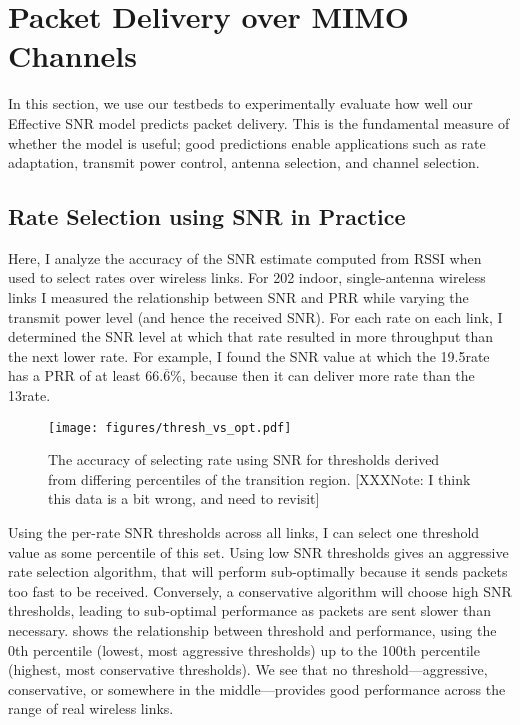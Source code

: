 \ifx\mainfile\undefined

\setcounter{chapter}{5} %
\fi

\cleardoublepage
\chapter{Packet Delivery over MIMO Channels}
\label{chap:delivery}

In this section, we use our testbeds to experimentally evaluate how well our Effective SNR model predicts packet delivery. This is the fundamental measure of whether the model is useful; good predictions enable applications such as rate adaptation, transmit power control, antenna selection, and channel selection.

\section{Rate Selection using SNR in Practice}
Here, I analyze the accuracy of the SNR estimate computed from RSSI when used to select rates over wireless links. For 202 indoor, single-antenna wireless links I measured the relationship between SNR and PRR while varying the transmit power level (and hence the received SNR). For each rate on each link, I determined the SNR level at which that rate resulted in more throughput than the next lower rate. For example, I found the SNR value at which the 19.5\Mbps rate has a PRR of at least $66.\overline{6}\%$, because then it can deliver more rate than the 13\Mbps rate.

\begin{figure}[t]
	\centering
	\texttt{[image: figures/thresh\_vs\_opt.pdf]}
	\caption{\label{fig:thresh_vs_opt}The accuracy of selecting rate using SNR for thresholds derived from differing percentiles of the transition region. [XXXNote: I think this data is a bit wrong, and need to revisit]}
\end{figure}
Using the per-rate SNR thresholds across all links, I can select one threshold value as some percentile of this set. Using low SNR thresholds gives an aggressive rate selection algorithm, that will perform sub-optimally because it sends packets too fast to be received.  Conversely, a conservative algorithm will choose high SNR thresholds, leading to sub-optimal performance as packets are sent slower than necessary.  shows the relationship between threshold and performance, using the 0th percentile (lowest, most aggressive thresholds) up to the 100th percentile (highest, most conservative thresholds). We see that no threshold---aggressive, conservative, or somewhere in the middle---provides good performance across the range of real wireless links.

